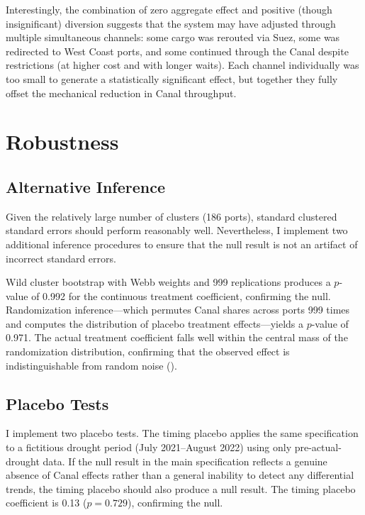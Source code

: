 \documentclass[12pt]{article}
\begin{document}
Interestingly, the combination of zero aggregate effect and positive (though insignificant) diversion suggests that the system may have adjusted through multiple simultaneous channels: some cargo was rerouted via Suez, some was redirected to West Coast ports, and some continued through the Canal despite restrictions (at higher cost and with longer waits). Each channel individually was too small to generate a statistically significant effect, but together they fully offset the mechanical reduction in Canal throughput.


\section{Robustness}
\label{sec:robustness}

\subsection{Alternative Inference}

Given the relatively large number of clusters (186 ports), standard clustered standard errors should perform reasonably well. Nevertheless, I implement two additional inference procedures to ensure that the null result is not an artifact of incorrect standard errors.

Wild cluster bootstrap \citep{cameron2008bootstrap} with Webb weights and 999 replications produces a $p$-value of 0.992 for the continuous treatment coefficient, confirming the null. Randomization inference---which permutes Canal shares across ports 999 times and computes the distribution of placebo treatment effects---yields a $p$-value of 0.971. The actual treatment coefficient falls well within the central mass of the randomization distribution, confirming that the observed effect is indistinguishable from random noise ().

\subsection{Placebo Tests}

I implement two placebo tests. The timing placebo applies the same specification to a fictitious drought period (July 2021--August 2022) using only pre-actual-drought data. If the null result in the main specification reflects a genuine absence of Canal effects rather than a general inability to detect any differential trends, the timing placebo should also produce a null result. The timing placebo coefficient is 0.13 ($p = 0.729$), confirming the null.
\end{document}
